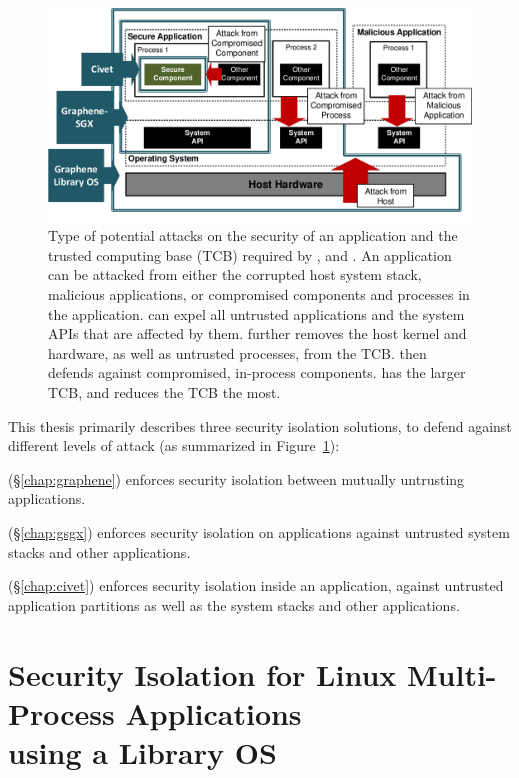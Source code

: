 \begin{figure}[t!]
\centering
\includegraphics[width=4.5in]{figures/defense.pdf}
\caption[Types of potential attacks on an application, and the TCB required by \graphene{}, \gsgx{} and \civet{}]
{Type of potential attacks on the security of an application and the trusted computing base (TCB) required by \graphene{}, \gsgx{} and \civet{}.
An application can be attacked from either the corrupted host system stack, malicious applications, or compromised components and processes in the application.
\graphene{} can expel all untrusted applications and the system APIs that are affected by them.
\gsgx{} further removes the host kernel and hardware, as well as untrusted processes, from the TCB. \civet{} then defends against compromised, in-process components. \graphene{} has the larger TCB, and \civet{} reduces the TCB the most.}
\label{fig:defense}
\end{figure}

This thesis primarily describes three security isolation solutions,
to defend against different levels of attack (as summarized in Figure~\ref{fig:defense}):
\begin{compactitem}
\item {\em \graphene{}} (\S\ref{chap:graphene}) enforces security isolation between mutually untrusting applications.
\item {\em \gsgx{}} (\S\ref{chap:gsgx}) enforces security isolation on applications against untrusted system stacks and other applications.
\item {\em \civet{}} (\S\ref{chap:civet}) enforces security isolation inside an application, against untrusted application partitions as well as the system stacks and other applications.
\end{compactitem}

\section{Security Isolation for Linux Multi-Process Applications\\ using a Library OS}
\label{sec:intro:graphene}

